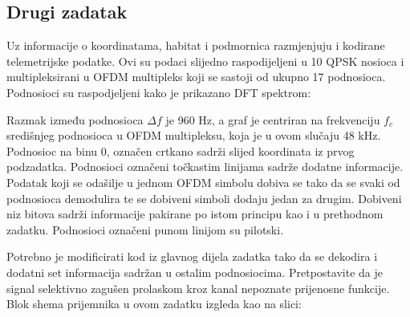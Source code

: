 \documentclass[a4paper]{article}
\begin{document}
\subsection{Drugi zadatak}

Uz informacije o koordinatama, habitat i podmornica razmjenjuju i kodirane telemetrijske podatke. Ovi su podaci slijedno raspodijeljeni u 10 QPSK nosioca i multipleksirani u OFDM  multipleks koji se sastoji od ukupno 17 podnosioca. Podnosioci su raspodjeljeni kako je prikazano DFT spektrom:
\begin{figure}[h!]
	\centering
\end{figure}
Razmak između podnosioca $\varDelta f$ je 960 Hz, a graf je centriran na frekvenciju $f_c$ središnjeg podnosioca u OFDM multipleksu, koja je u ovom slučaju 48 kHz. Podnosioc na binu 0, označen crtkano sadrži slijed koordinata iz prvog podzadatka. Podnosioci označeni točkastim linijama sadrže dodatne informacije. Podatak koji se odašilje u jednom OFDM simbolu dobiva se tako da se svaki od podnosioca demodulira te se dobiveni simboli dodaju jedan za drugim. Dobiveni niz bitova sadrži informacije pakirane po istom principu kao i u prethodnom zadatku. Podnosioci označeni punom linijom su pilotski.

Potrebno je modificirati kod iz glavnog dijela zadatka tako da se dekodira i dodatni set informacija sadržan u ostalim podnosiocima. Pretpostavite da je signal selektivno zagušen prolaskom kroz kanal nepoznate prijenosne funkcije. Blok shema prijemnika u ovom zadatku izgleda kao na slici:
\end{document}

